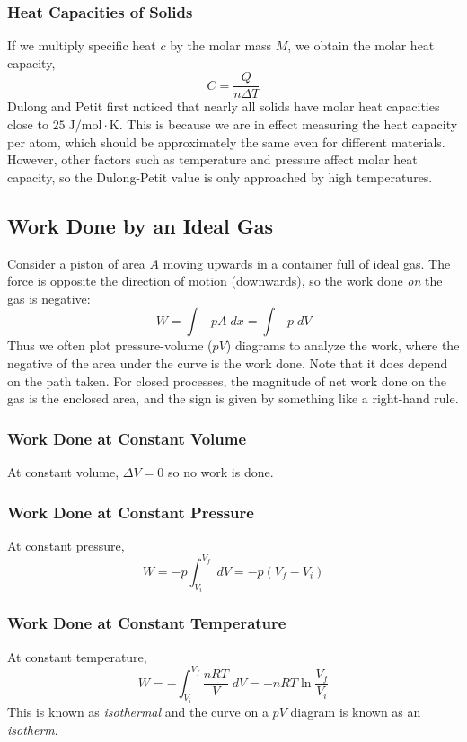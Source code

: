 \documentclass[../PhysicsFormulae.tex]{subfiles}
\begin{document}
\subsubsection{Heat Capacities of Solids}
If we multiply specific heat $c$ by the molar mass $M$, we obtain the molar heat capacity, 
\[ C = \frac{Q}{n\Delta T} \] 
Dulong and Petit first noticed that nearly all solids have molar heat capacities close to $25 \; \mathrm{J/mol \cdot K}$. This is because we are in effect measuring the heat capacity per atom, which should be approximately the same even for different materials. However, other factors such as temperature and pressure affect molar heat capacity, so the Dulong-Petit value is only approached by high temperatures.

\subsection{Work Done by an Ideal Gas}
Consider a piston of area $A$ moving upwards in a container full of ideal gas. The force is opposite the direction of motion (downwards), so the work done \textit{on} the gas is negative: 
\[ W = \int -pA \; dx = \int -p \; dV \]
Thus we often plot pressure-volume ($pV$) diagrams to analyze the work, where the negative of the area under the curve is the work done. Note that it does depend on the path taken. For closed processes, the magnitude of net work done on the gas is the enclosed area, and the sign is given by something like a right-hand rule.

\subsubsection{Work Done at Constant Volume}
At constant volume, $\Delta V = 0$ so no work is done. 

\subsubsection{Work Done at Constant Pressure}
At constant pressure, 
\[ W = -p\int_{V_i}^{V_f} \; dV = -p (V_f - V_i) \] 

\subsubsection{Work Done at Constant Temperature}
At constant temperature, 
\[ W = -\int_{V_i}^{V_f} \frac{nRT}{V} \; dV = - nRT \ln{\frac{V_f}{V_i}} \]
This is known as \textit{isothermal} and the curve on a $pV$ diagram is known as an \textit{isotherm}. 
\end{document}
